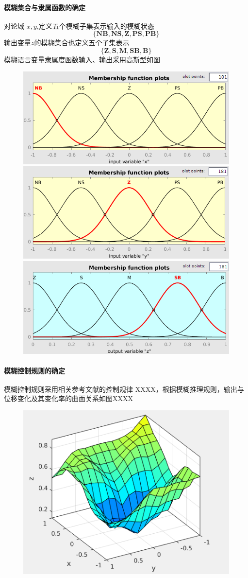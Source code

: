 \paragraph{模糊集合与隶属函数的确定}
\qquad 对论域 $x,y$,定义五个模糊子集表示输入的模糊状态
\[\mathbf{\lbrace NB,NS,Z,PS,PB\rbrace}\]
输出变量$z$的模糊集合也定义五个子集表示
\[\mathbf{\lbrace Z,S,M,SB,B\rbrace}\]
模糊语言变量隶属度函数输入、输出采用高斯型如图
\begin{figure}[H]
\centering
\includegraphics[width=0.5\linewidth]{figure/fuzzyx}
\includegraphics[width=0.5\linewidth]{figure/fuzzyy}
\includegraphics[width=0.5\linewidth]{figure/fuzzyz}
\end{figure}

\paragraph{模糊控制规则的确定}
\qquad 模糊控制规则采用相关参考文献的控制规律 XXXX，根据模糊推理规则，输出与位移变化及其变化率的曲面关系如图XXXX
\begin{figure}[H]
\centering
\includegraphics[width=0.5\linewidth]{figure/fuzzysurface}
\end{figure}

